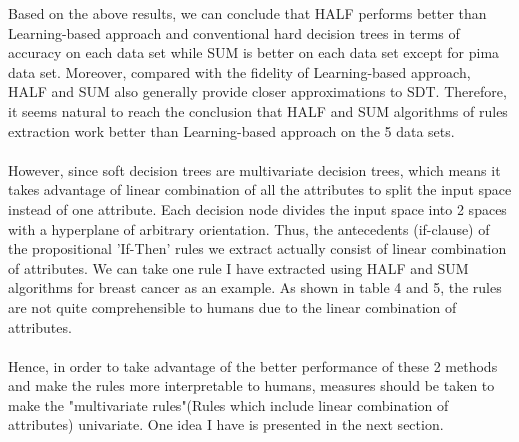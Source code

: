 \documentclass[12pt]{article}%
\begin{document}
Based on the above results, we can conclude that HALF performs better than Learning-based approach and conventional hard decision trees in terms of accuracy on each data set while SUM is better on each data set except for pima data set. Moreover, compared with the fidelity of Learning-based approach, HALF and SUM also generally provide closer approximations to SDT. Therefore, it seems natural to reach the conclusion that HALF and SUM algorithms of rules extraction work better than Learning-based approach on the 5 data sets. 
\\\\
However, since soft decision trees are multivariate decision trees, which means it takes advantage of linear combination of all the attributes to split the input space instead of one attribute. Each decision node divides the input space into 2 spaces with a hyperplane of arbitrary orientation. Thus, the antecedents (if-clause) of the propositional 'If-Then' rules we extract actually consist of linear combination of attributes. We can take one rule I have extracted using HALF and SUM algorithms for breast cancer as an example. As shown in table 4 and 5, the rules are not quite comprehensible to humans due to the linear combination of attributes.
\\\\
Hence, in order to take advantage of the better performance of these 2 methods and make the rules more interpretable to humans, measures should be taken to make the "multivariate rules"(Rules which include linear combination of attributes) univariate. One idea I have is presented in the next section. 
\end{document}

